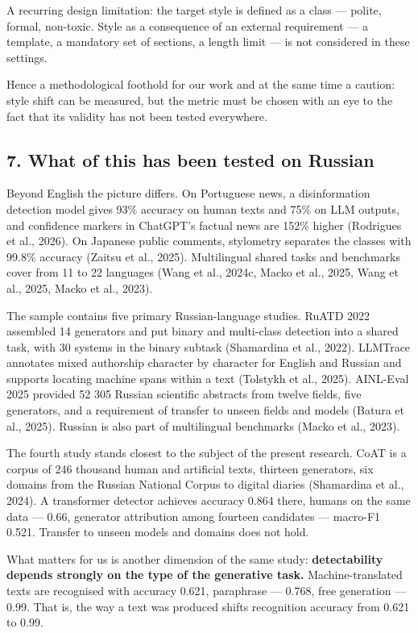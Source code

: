 \documentclass[11pt,a4paper]{article}
\renewcommand{\_}{\textunderscore\allowbreak}
\begin{document}
A recurring design limitation: the target style is defined as a class — polite,
formal, non-toxic. Style as a consequence of an external requirement — a
template, a mandatory set of sections, a length limit — is not considered in
these settings.

Hence a methodological foothold for our work and at the same time a caution:
style shift can be measured, but the metric must be chosen with an eye to the
fact that its validity has not been tested everywhere.

\subsection{7. What of this has been tested on Russian}

Beyond English the picture differs. On Portuguese news, a disinformation
detection model gives 93\% accuracy on human texts and 75\% on
LLM outputs, and confidence markers in ChatGPT's factual news are 152\% higher (Rodrigues et al., 2026). On
Japanese public comments, stylometry separates the classes with 99.8\% accuracy
(Zaitsu et al., 2025). Multilingual shared tasks and benchmarks cover from 11 to 22 languages
(Wang et al., 2024c, Macko et al., 2025, Wang et al., 2025, Macko et al., 2023).

The sample contains five primary Russian-language studies. RuATD 2022 assembled 14 generators
and put binary and multi-class detection into a shared task, with 30 systems in the binary
subtask (Shamardina et al., 2022). LLMTrace annotates mixed authorship character by character for
English and Russian and supports locating machine spans within a text
(Tolstykh et al., 2025). AINL-Eval 2025 provided 52 305 Russian scientific abstracts from twelve
fields, five generators, and a requirement of transfer to unseen fields and models
(Batura et al., 2025). Russian is also part of multilingual benchmarks (Macko et al., 2023).

The fourth study stands closest to the subject of the present research. CoAT is
a corpus of 246 thousand human and artificial texts, thirteen generators,
six domains from the Russian National Corpus to digital diaries (Shamardina et al., 2024).
A transformer detector achieves accuracy 0.864 there, humans on the same data — 0.66,
generator attribution among fourteen candidates — macro-F1 0.521. Transfer to
unseen models and domains does not hold.

What matters for us is another dimension of the same study: \textbf{detectability
depends strongly on the type of the generative task.} Machine-translated texts
are recognised with accuracy 0.621, paraphrase — 0.768, free generation — 0.99.
That is, the way a text was produced shifts recognition accuracy from 0.621
to 0.99.
\end{document}
